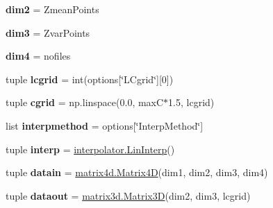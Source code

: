 \begin{DoxyCompactItemize}
\item 
\hypertarget{namespacechemtable__io_a16ed306684d7fb0ef235255e12d27ea5}{
{\bfseries dim2} = ZmeanPoints}
\label{dc/dad/namespacechemtable__io_a16ed306684d7fb0ef235255e12d27ea5}

\item 
\hypertarget{namespacechemtable__io_a6d0fa1ea6c7ebb019dfdfd50a32efa05}{
{\bfseries dim3} = ZvarPoints}
\label{dc/dad/namespacechemtable__io_a6d0fa1ea6c7ebb019dfdfd50a32efa05}

\item 
\hypertarget{namespacechemtable__io_ac103d54d60e2e09633aba1d821e286f2}{
{\bfseries dim4} = nofiles}
\label{dc/dad/namespacechemtable__io_ac103d54d60e2e09633aba1d821e286f2}

\item 
\hypertarget{namespacechemtable__io_a3be3b3afee8f4630816646148e390b63}{
tuple {\bfseries lcgrid} = int(options\mbox{[}\char`\"{}LCgrid\char`\"{}\mbox{]}\mbox{[}0\mbox{]})}
\label{dc/dad/namespacechemtable__io_a3be3b3afee8f4630816646148e390b63}

\item 
\hypertarget{namespacechemtable__io_acd8bbce626a77c6df2499d3e25ba5214}{
tuple {\bfseries cgrid} = np.linspace(0.0, maxC$\ast$1.5, lcgrid)}
\label{dc/dad/namespacechemtable__io_acd8bbce626a77c6df2499d3e25ba5214}

\item 
\hypertarget{namespacechemtable__io_a1ab9c84e5b10a56c4343631f0e21390e}{
list {\bfseries interpmethod} = options\mbox{[}\char`\"{}InterpMethod\char`\"{}\mbox{]}}
\label{dc/dad/namespacechemtable__io_a1ab9c84e5b10a56c4343631f0e21390e}

\item 
\hypertarget{namespacechemtable__io_a1399674360497d138020818cd35cde4c}{
tuple {\bfseries interp} = \hyperlink{classinterpolator_1_1LinInterp}{interpolator.LinInterp}()}
\label{dc/dad/namespacechemtable__io_a1399674360497d138020818cd35cde4c}

\item 
\hypertarget{namespacechemtable__io_a817a4fe131477602184c4fb1904dd334}{
tuple {\bfseries datain} = \hyperlink{classmatrix4d_1_1Matrix4D}{matrix4d.Matrix4D}(dim1, dim2, dim3, dim4)}
\label{dc/dad/namespacechemtable__io_a817a4fe131477602184c4fb1904dd334}

\item 
\hypertarget{namespacechemtable__io_a410b4e5118e2e772174026e9aef79c9e}{
tuple {\bfseries dataout} = \hyperlink{classmatrix3d_1_1Matrix3D}{matrix3d.Matrix3D}(dim2, dim3, lcgrid)}
\label{dc/dad/namespacechemtable__io_a410b4e5118e2e772174026e9aef79c9e}


\end{DoxyCompactItemize}
